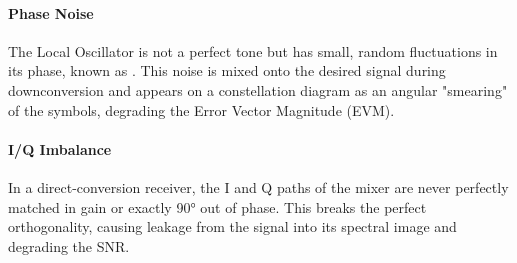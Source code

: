\paragraph{Phase Noise}
The Local Oscillator is not a perfect tone but has small, random fluctuations in its phase, known as . This noise is mixed onto the desired signal during downconversion and appears on a constellation diagram as an angular "smearing" of the symbols, degrading the Error Vector Magnitude (EVM).

\paragraph{I/Q Imbalance}
In a direct-conversion receiver, the I and Q paths of the mixer are never perfectly matched in gain or exactly 90° out of phase. This  breaks the perfect orthogonality, causing leakage from the signal into its spectral image and degrading the SNR.

